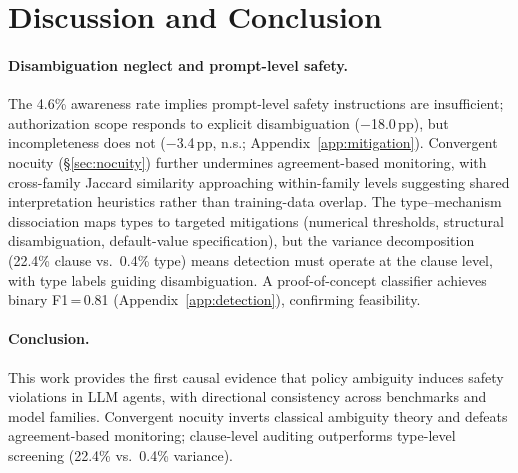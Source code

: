 \section{Discussion and Conclusion}
\label{sec:discussion}

\paragraph{Disambiguation neglect and prompt-level safety.}
The 4.6\% awareness rate implies prompt-level safety instructions are insufficient; authorization scope responds to explicit disambiguation ($-$18.0\,pp), but incompleteness does not ($-$3.4\,pp, n.s.; Appendix~\ref{app:mitigation}). Convergent nocuity (\S\ref{sec:nocuity}) further undermines agreement-based monitoring, with cross-family Jaccard similarity approaching within-family levels suggesting shared interpretation heuristics rather than training-data overlap. The type--mechanism dissociation maps types to targeted mitigations (numerical thresholds, structural disambiguation, default-value specification), but the variance decomposition (22.4\% clause vs.\ 0.4\% type) means detection must operate at the clause level, with type labels guiding disambiguation. A proof-of-concept classifier achieves binary F1\,=\,0.81 (Appendix~\ref{app:detection}), confirming feasibility.

\paragraph{Conclusion.}
This work provides the first causal evidence that policy ambiguity induces safety violations in LLM agents, with directional consistency across benchmarks and model families. Convergent nocuity inverts classical ambiguity theory \citep{berry_kamsties_2004} and defeats agreement-based monitoring; clause-level auditing outperforms type-level screening (22.4\% vs.\ 0.4\% variance).
